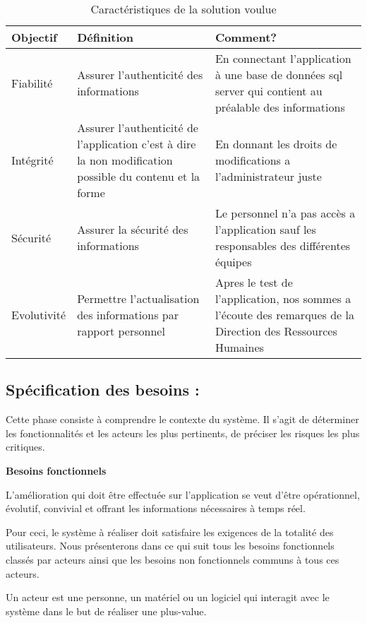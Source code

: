 \begin{table}[H]
	\caption{Caractéristiques de la solution voulue}
	\label{Caractéristiques de la solution voulue}
	\centering
	\begin{tabularx}{\linewidth}{|X|X|X|}
		\hline \rowcolor{lightgray}  
		\textbf{Objectif} & \textbf{Définition} & \textbf{Comment?}\\
		\hline
		Fiabilité & Assurer l'authenticité des informations &  En connectant l'application à une base de données sql server qui contient au préalable des informations\\
		\hline
		Intégrité & Assurer l'authenticité de l'application c'est à dire la non modification possible du contenu et la forme &  En donnant les droits de modifications a l'administrateur juste\\
		\hline
		Sécurité & Assurer la sécurité des informations & Le personnel n'a pas accès a l'application sauf les responsables des différentes équipes\\
		\hline
		Evolutivité  & Permettre l'actualisation des informations par rapport personnel &  Apres le test de l'application, nos sommes a l'écoute des remarques de la Direction des Ressources Humaines \\	
		\hline
		
	\end{tabularx}
\end{table}

\subsection{Spécification des besoins :}

Cette phase consiste à comprendre le contexte du système. Il s’agit de déterminer les fonctionnalités et les acteurs les plus pertinents, de préciser les risques les plus critiques.

\textbf{Besoins fonctionnels}

L’amélioration qui doit être effectuée sur l’application se veut d’être opérationnel, évolutif, convivial et offrant les informations nécessaires à temps réel.

Pour ceci, le système à réaliser doit satisfaire les exigences de la totalité des utilisateurs. Nous présenterons dans ce qui suit tous les besoins fonctionnels classés par acteurs ainsi que les besoins non fonctionnels communs à tous ces acteurs.

Un acteur est une personne, un matériel ou un logiciel qui interagit avec le système dans le but de réaliser une plus-value.


